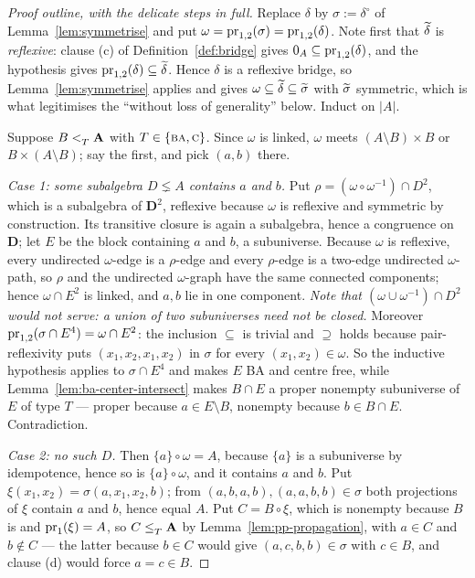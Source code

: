 \begin{proof}[Proof outline, with the delicate steps in full]
Replace $\delta$ by $\sigma:=\delta^{\circ}$ of Lemma~\ref{lem:symmetrise} and
put $\omega=\operatorname*{pr}_{1,2}(\sigma)=\operatorname*{pr}_{1,2}(\delta)$. Note first that
$\widetilde{\delta}$ is \emph{reflexive}: clause (c) of Definition~\ref{def:bridge}
gives $0_{A}\subseteq\operatorname*{pr}_{1,2}(\delta)$, and the hypothesis gives
$\operatorname*{pr}_{1,2}(\delta)\subseteq\widetilde{\delta}$. Hence $\delta$ is a reflexive
bridge, so Lemma~\ref{lem:symmetrise} applies and gives
$\omega\subseteq\widetilde{\delta}\subseteq\widetilde{\sigma}$ with $\widetilde{\sigma}$
symmetric, which is what legitimises the ``without loss of generality'' below.
Induct on $|A|$.

Suppose $B<_{T}^{}\mathbf A$ with $T\in\{\textup{\textsc{ba}},\textup{\textsc{c}}\}$. Since $\omega$ is linked,
$\omega$ meets $(A\setminus B)\times B$ or $B\times(A\setminus B)$; say the
first, and pick $(a,b)$ there.

\emph{Case 1: some subalgebra $D\lneq A$ contains $a$ and $b$.} Put
$\rho=(\omega\circ\omega^{-1})\cap D^{2}$, which is a subalgebra of
$\mathbf D^{2}$, reflexive because $\omega$ is reflexive and symmetric by
construction. Its transitive closure is again a subalgebra, hence a congruence
on $\mathbf D$; let $E$ be the block containing $a$ and $b$, a subuniverse.
Because $\omega$ is reflexive, every undirected $\omega$-edge is a $\rho$-edge
and every $\rho$-edge is a two-edge undirected $\omega$-path, so $\rho$ and the
undirected $\omega$-graph have the same connected components; hence
$\omega\cap E^{2}$ is linked, and $a,b$ lie in one component.
\emph{Note that $(\omega\cup\omega^{-1})\cap D^{2}$ would not serve: a union of
two subuniverses need not be closed.} Moreover
$\operatorname*{pr}_{1,2}(\sigma\cap E^{4})=\omega\cap E^{2}$: the inclusion $\subseteq$ is
trivial and $\supseteq$ holds because pair-reflexivity puts
$(x_{1},x_{2},x_{1},x_{2})$ in $\sigma$ for every $(x_{1},x_{2})\in\omega$.
So the inductive hypothesis applies to $\sigma\cap E^{4}$ and makes $E$ BA and
centre free, while Lemma~\ref{lem:ba-center-intersect} makes $B\cap E$ a proper
nonempty subuniverse of $E$ of type $T$ --- proper because $a\in E\setminus B$,
nonempty because $b\in B\cap E$. Contradiction.

\emph{Case 2: no such $D$.} Then $\{a\}\circ\omega=A$, because $\{a\}$ is a
subuniverse by idempotence, hence so is $\{a\}\circ\omega$, and it contains
$a$ and $b$. Put $\xi(x_{1},x_{2})=\sigma(a,x_{1},x_{2},b)$; from
$(a,b,a,b),(a,a,b,b)\in\sigma$ both projections of $\xi$ contain $a$ and $b$,
hence equal $A$. Put $C=B\circ\xi$, which is nonempty because $B$ is and $\operatorname*{pr}_{1}(\xi)=A$, so
$C\le_{T}^{}\mathbf A$ by Lemma~\ref{lem:pp-propagation}, with $a\in C$ and
$b\notin C$ --- the latter
because $b\in C$ would give $(a,c,b,b)\in\sigma$ with $c\in B$, and clause (d)
would force $a=c\in B$.


\end{proof}

